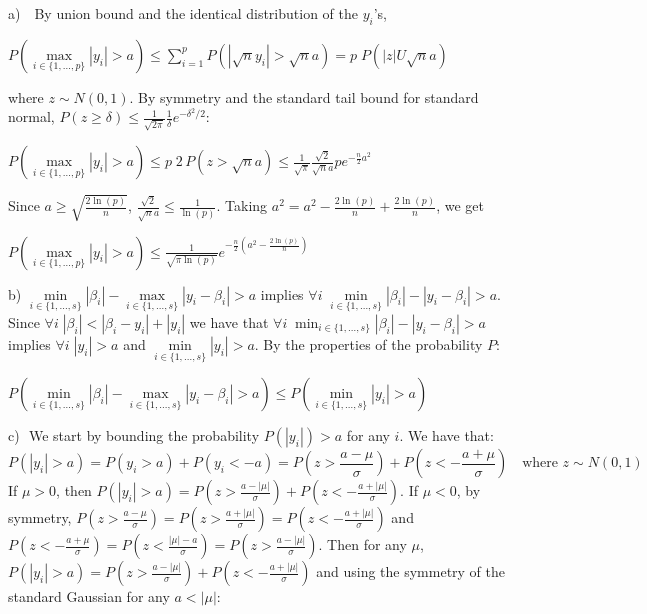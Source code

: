 \documentclass[aos]{imsart}
\theoremstyle{plain}
\begin{document}
	a) \,\, By union bound and the identical distribution of the $y_i$'s,
\begin{center}
    $P\left(\underset{i\in\{1,\ldots,p\}}{\max}|y_i|> a \right)     \leq \sum_{i=1}^{p}{ P\left(|\sqrt{n}y_i|>\sqrt{n}a \right)}
    = p\; P\left(|z|U\sqrt{n}a\right)$
\end{center}
    where $z\sim N(0,1)$. 
    By symmetry and the standard tail bound for standard normal, $P(z \geq \delta) \leq \frac{1}{\sqrt{2\pi}} \frac{1}{\delta} e^{-\delta^{2} / 2}$:
\begin{center}
  $P\left(\underset{i\in\{1,\ldots,p\}}{\max}|y_i|> a \right) 
     \leq  p\; 2 \, P\left(z>\sqrt{n}a\right) \leq \frac{1}{\sqrt{\pi}}\frac{\sqrt{2}}{\sqrt{n}a}p e^{-\frac{n}{2} a^{2}}$
\end{center}
Since $a \geq \sqrt{\frac{2\ln(p)}{n}}$, $\frac{\sqrt{2}}{\sqrt{n}a}\leq \frac{1}{\ln(p)}$. Taking $a^2=a^2-\frac{2\ln(p)}{n}+\frac{2\ln(p)}{n}$, we get \begin{center}
$ P\left(\underset{i\in\{1,\ldots,p\}}{\max}|y_i|> a \right) \leq \frac{1}{\sqrt{\pi\ln(p)}} e^{-\frac{n}{2} \left(a^{2}-\frac{2\ln(p)}{n}\right)}$ \\\end{center}
b) $ \underset{i \in \{1,\ldots,s\}}{\min}|\beta_i|- \underset{i \in \{1,\ldots,s\}}{\max}|y_i-\beta_i| > a$ implies $\forall i \; \underset{i \in \{1,\ldots,s\}}{\min}|\beta_i| - |y_i-\beta_i| > a $. Since $\forall i \; |\beta_i|< |\beta_i-y_i|+|y_i|$ we have that $ \forall i \; \min_{i \in \{1,\ldots,s\}}|\beta_i| - |y_i-\beta_i| > a$ implies $\forall i \; |y_i| > a $ and $ \underset{i \in \{1,\ldots,s\}}{\min}|y_i| > a$. By the properties of the probability $P$: 
\begin{center}$ P\left(\underset{i \in \{1,\ldots,s\}}{\min}|\beta_i|-\underset{i \in \{1,\ldots,s\}}{\max}|y_i-\beta_i| > a\right) \leq P\left(\underset{i \in \{1,\ldots,s\}}{\min}|y_i| > a\right) $ \end{center}
c)\,\, We start by bounding the probability $P(|y_i|)>a$ for any $i$. We have that:
$$P(|y_i|>a) = P(y_i>a) + P(y_i<-a) = P(z>\frac{a-\mu}{\sigma}) + P(z<-\frac{a+\mu}{\sigma}) \quad \text{where }z\sim N(0,1)$$
If $\mu>0$, then $P(|y_i|>a) =  P(z>\frac{a-|\mu|}{\sigma}) + P(z<-\frac{a+|\mu|}{\sigma})$. If $\mu<0$, by symmetry, $P(z>\frac{a-\mu}{\sigma})=P(z>\frac{a+|\mu|}{\sigma})=P(z<-\frac{a+|\mu|}{\sigma})$ and $P(z<-\frac{a+\mu}{\sigma})=P(z<\frac{|\mu|-a}{\sigma})=P(z>\frac{a-|\mu|}{\sigma})$. Then for any $\mu$, $P(|y_i|>a)  = P(z>\frac{a-|\mu|}{\sigma}) + P(z<-\frac{a+|\mu|}{\sigma}) $ and using the symmetry of the standard Gaussian for any $a<|\mu|$: 
\end{document}
